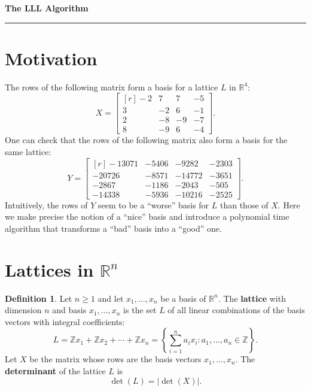 \documentclass[11pt,letterpaper]{article}
\newcommand{\integers}{\mathbb{Z}}
\newcommand{\reals}{\mathbb{R}}
\newtheorem{lemma}{Lemma}[section]
\theoremstyle{definition}
\newtheorem{definition}{Definition}[section]
\begin{document}
\begin{center}
{\bf \Large The LLL Algorithm} %
\vspace{0.2cm}
\hrule
\end{center}
%	
\section{Motivation}
The rows of the following matrix form a basis for a lattice $L$ in $\reals^4$:
\[
X = \begin{bmatrix*}[r]
	-2 & 7 & 7 & -5\\
	3 & -2 & 6 & -1\\
	2 & -8 & -9 & -7\\
	8 & -9 & 6 & -4
\end{bmatrix*}.
\]
One can check that the rows of the following matrix also form a basis for the same lattice:
\[
Y = \begin{bmatrix*}[r]
	-13071 & -5406 & -9282 & -2303\\
	-20726 & -8571 & -14772 & -3651\\
	-2867 & -1186 & -2043 & -505\\
	-14338 & -5936 & -10216 & -2525
\end{bmatrix*}.
\]
Intuitively, the rows of $Y$ seem to be a ``worse'' basis for $L$ than those of $X$. Here we make precise the notion of a ``nice'' basis and introduce a polynomial time algorithm that transforms a ``bad'' basis into a ``good'' one. 

\section{Lattices in $\reals^n$}
\begin{definition}
	Let $n\geq 1$ and let $x_1, \ldots, x_n$ be a basis of $\reals^n$. The \textbf{lattice} with dimension $n$ and basis $x_1, \ldots, x_n$ is the set $L$ of all linear combinations of the basis vectors with integral coefficients:
	\[
	L = \integers x_1 + \integers x_2 + \cdots + \integers x_n = \left\{\sum_{i=1}^na_ix_i: a_1, \ldots, a_n\in \integers\right\}.
	\]
	Let $X$ be the matrix whose rows are the basis vectors $x_1, \ldots, x_n$. The \textbf{determinant} of the lattice $L$ is
	\[
	\det(L) = |\det(X)|.
	\]
\end{definition}

\end{document}
